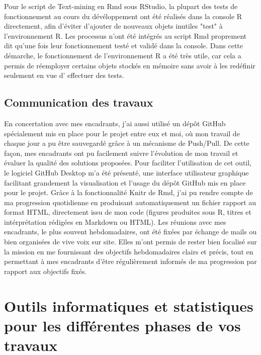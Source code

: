 \documentclass{book}
\begin{document}
    
Pour le script de Text-mining en Rmd sous RStudio, la plupart des tests de fonctionnement au cours du dévéloppement ont été réalisés dans la console R directement, afin d'éviter d'ajouter de nouveaux objets inutiles "test" à l'environnement R. Les processus n'ont été intégrés au script Rmd proprement dit qu'une fois leur fonctionnement testé et validé dans la console. Dans cette démarche, le fonctionnement de l'environnement R a été très utile, car cela a permis de réemployer certains objets stockés en mémoire sans avoir à les redéfinir seulement en vue d' effectuer des tests.
\subsection{Communication des travaux}
\noindent
En concertation avec mes encadrants, j'ai aussi utilisé un dépôt GitHub spécialement
mis en place pour le projet entre eux et moi, où mon travail de chaque jour a pu être sauvegardé grâce à un mécanisme de Push/Pull. De cette façon, mes encadrants ont pu facilement suivre l'évolution de mon travail et évaluer la qualité des solutions proposées. Pour faciliter l'utilisation de cet outil, le logiciel GitHub Desktop m'a été présenté, une interface utilisateur graphique facilitant grandement la visualisation et l'usage du dépôt GitHub mis en place pour le projet. Grâce à la fonctionnalité Knitr de Rmd, j'ai pu rendre compte de ma progression quotidienne en produisant automatiquement un fichier rapport au format HTML, directement issu de mon code (figures produites sous R, titres et intérprétation rédigées en Markdown ou HTML). Les réunions avec mes encadrants, le plus souvent hebdomadaires, ont été fixées par échange de mails ou bien organisées de vive voix sur site. Elles m'ont permis de rester bien focalisé sur la mission en me fournissant des objectifs hebdomadaires clairs et précis, tout en permettant à mes encadrants d'être régulièrement informés de ma progression par rapport aux objectifs fixés.

\thispagestyle{fancy}

\section[Outils informatiques et statistiques]{Outils informatiques et
  statistiques pour les différentes phases de vos travaux}
  
\end{document}
